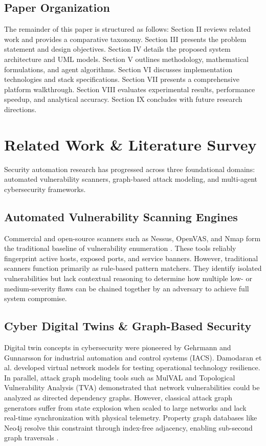 \documentclass[conference]{IEEEtran}
\begin{document}
\subsection{Paper Organization}
The remainder of this paper is structured as follows: Section II reviews related work and provides a comparative taxonomy. Section III presents the problem statement and design objectives. Section IV details the proposed system architecture and UML models. Section V outlines methodology, mathematical formulations, and agent algorithms. Section VI discusses implementation technologies and stack specifications. Section VII presents a comprehensive platform walkthrough. Section VIII evaluates experimental results, performance speedup, and analytical accuracy. Section IX concludes with future research directions.

\section{Related Work \& Literature Survey}
Security automation research has progressed across three foundational domains: automated vulnerability scanners, graph-based attack modeling, and multi-agent cybersecurity frameworks.

\subsection{Automated Vulnerability Scanning Engines}
Commercial and open-source scanners such as Nessus, OpenVAS, and Nmap form the traditional baseline of vulnerability enumeration \cite{nmap2026}. These tools reliably fingerprint active hosts, exposed ports, and service banners. However, traditional scanners function primarily as rule-based pattern matchers. They identify isolated vulnerabilities but lack contextual reasoning to determine how multiple low- or medium-severity flaws can be chained together by an adversary to achieve full system compromise.

\subsection{Cyber Digital Twins \& Graph-Based Security}
Digital twin concepts in cybersecurity were pioneered by Gehrmann and Gunnarsson \cite{gehrmann2020digital} for industrial automation and control systems (IACS). Damodaran et al. \cite{damodaran2022cyber} developed virtual network models for testing operational technology resilience. In parallel, attack graph modeling tools such as MulVAL \cite{ou2005mulval} and Topological Vulnerability Analysis (TVA) \cite{jajodia2005topological} demonstrated that network vulnerabilities could be analyzed as directed dependency graphs. However, classical attack graph generators suffer from state explosion when scaled to large networks and lack real-time synchronization with physical telemetry. Property graph databases like Neo4j resolve this constraint through index-free adjacency, enabling sub-second graph traversals \cite{robinson2015graph}.
\end{document}
